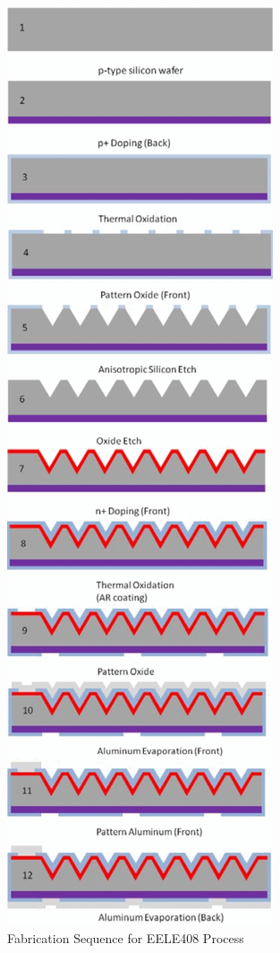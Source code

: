 \documentclass[letter,12pt]{article}
\begin{document}
		\begin{figure}[h!]
			\centering
			\includegraphics[height=.65\textheight]{./Images/Fabrication_Sequence.png}
			\caption{Fabrication Sequence for EELE408 Process \cite{408_Lab_Manual}}
			\label{fig:Fabrication_Sequence}
		\end{figure}
		
\end{document}
